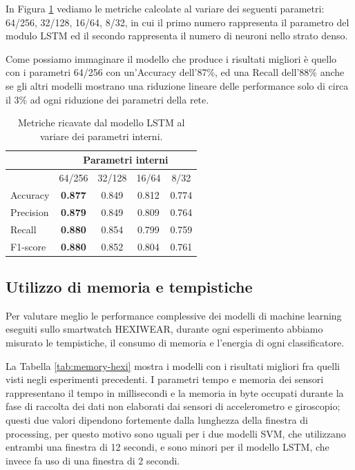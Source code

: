 In Figura \ref{tab:metrics-lstm-param-hexi} vediamo le metriche calcolate al variare dei seguenti parametri: 64/256, 32/128, 16/64, 8/32, in cui il primo numero rappresenta il parametro del modulo LSTM ed il secondo rappresenta il numero di neuroni nello strato denso. 

Come possiamo immaginare il modello che produce i risultati migliori è quello con i parametri 64/256 con un'Accuracy dell'87\%, ed una Recall dell'88\% anche se gli altri modelli mostrano una riduzione lineare delle performance solo di circa il 3\% ad ogni riduzione dei parametri della rete.

\begin{table}
    \centering
    \begin{tabular}{l c c c c}
        \hline
        & \multicolumn{4}{c}{Parametri interni} \\
        \hline
        & 64/256 & 32/128 & 16/64 & 8/32 \\
        \hline
        Accuracy & \textbf{0.877} & 0.849 & 0.812 & 0.774 \\
        Precision & \textbf{0.879} & 0.849 & 0.809 & 0.764 \\
        Recall & \textbf{0.880} & 0.854 & 0.799 & 0.759 \\
        F1-score & \textbf{0.880} & 0.852 & 0.804 & 0.761 \\
        \hline
    \end{tabular}
    \caption{Metriche ricavate dal modello LSTM al variare dei parametri interni.}
    \label{tab:metrics-lstm-param-hexi}
\end{table}

\subsection{Utilizzo di memoria e tempistiche}
\label{ssec:utilizzo-di-memoria-e-tempistiche-hexi}

Per valutare meglio le performance complessive dei modelli di machine learning eseguiti sullo smartwatch HEXIWEAR, durante ogni esperimento abbiamo misurato le tempistiche, il consumo di memoria e l'energia di ogni classificatore.

La Tabella \ref{tab:memory-hexi} mostra i modelli con i risultati migliori fra quelli visti negli esperimenti precedenti. I parametri tempo e memoria dei sensori rappresentano il tempo in millisecondi e la memoria in byte occupati durante la fase di raccolta dei dati non elaborati dai sensori di accelerometro e giroscopio; questi due valori dipendono fortemente dalla lunghezza della finestra di processing, per questo motivo sono uguali per i due modelli SVM, che utilizzano entrambi una finestra di 12 secondi, e sono minori per il modello LSTM, che invece fa uso di una finestra di 2 secondi.

